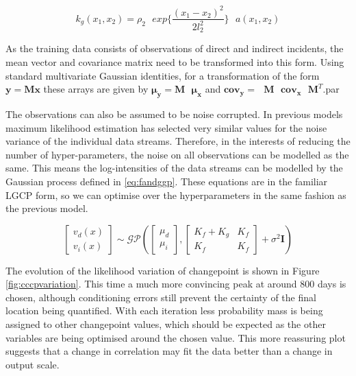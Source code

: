 \documentclass[a4paper,11pt]{report}
\begin{document}
\begin{equation} \label{eq:kg}
k_g(x_1,x_2) = \rho_2 \text{ }exp\{\frac{(x_1-x_2)^2}{2 l_2^2}\} \text{ } a(x_1,x_2)
\end{equation}


As the training data consists of observations of direct and indirect incidents, the mean vector and covariance matrix need to be transformed into this form. Using standard multivariate Gaussian identities, for a transformation of the form \(\mathbf{y}= \mathbf{M} \mathbf{x}\) these arrays are given by \(\boldsymbol{\mu_y}= \mathbf{M}\text{ }\boldsymbol{\mu_x}\) and \(\mathbf{cov_y}= \text{ }\mathbf{M}\text{ } \mathbf{cov_x} \text{ } \mathbf{M}^{T}\).par

The observations can also be assumed to be noise corrupted. In previous models maximum likelihood estimation has selected very similar values for the noise variance of the individual data streams. Therefore, in the interests of reducing the number of hyper-parameters, the noise on all observations can be modelled as the same. This means the log-intensities of the data streams can be modelled by the Gaussian process defined in \ref{eq:fandggp}. These equations are in the familiar LGCP form, so we can optimise over the hyperparameters in the same fashion as the previous model. 

\begin{equation} \label{eq:fandggp}
\left[ \begin{array}{cc}
v_d(x)  \\
v_i(x) \end{array} \right] \sim \mathcal{G}\mathcal{P} \left( \left[ \begin{array}{cc}
\mu_d  \\
\mu_i \end{array} \right], \left[ \begin{array}{cc}
K_f + K_g & K_f  \\
K_f  & K_f  \end{array} \right] + \sigma^2 \mathbf{I} \right)
\end{equation}

The evolution of the likelihood variation of changepoint is shown in Figure \ref{fig:cccpvariation}. This time a much more convincing peak at around 800 days is chosen, although conditioning errors still prevent the certainty of the final location being quantified. With each iteration less probability mass is being assigned to other changepoint values, which should be expected as the other variables are being optimised around the chosen value. This more reassuring plot suggests that a change in correlation may fit the data better than a change in output scale. \par
\end{document}
